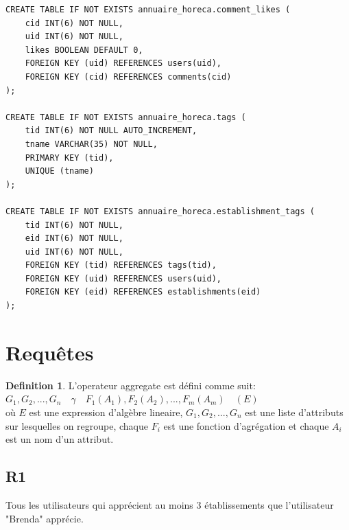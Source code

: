\documentclass[11pt,a4paper]{report}
\begin{document}
\begin{verbatim}
CREATE TABLE IF NOT EXISTS annuaire_horeca.comment_likes (
    cid INT(6) NOT NULL,
    uid INT(6) NOT NULL,
    likes BOOLEAN DEFAULT 0,
    FOREIGN KEY (uid) REFERENCES users(uid),
    FOREIGN KEY (cid) REFERENCES comments(cid)
);

CREATE TABLE IF NOT EXISTS annuaire_horeca.tags (
    tid INT(6) NOT NULL AUTO_INCREMENT,
    tname VARCHAR(35) NOT NULL,
    PRIMARY KEY (tid),
    UNIQUE (tname)
);

CREATE TABLE IF NOT EXISTS annuaire_horeca.establishment_tags (
    tid INT(6) NOT NULL,
    eid INT(6) NOT NULL,
    uid INT(6) NOT NULL,
    FOREIGN KEY (tid) REFERENCES tags(tid),
    FOREIGN KEY (uid) REFERENCES users(uid),
    FOREIGN KEY (eid) REFERENCES establishments(eid)
);
\end{verbatim}

\section*{Requêtes}
\theoremstyle{plain}
\newtheorem{thm}{Theorem}
\theoremstyle{definition}
\newtheorem{defn}[thm]{Definition}

\begin{defn} L'operateur aggregate est défini comme suit: \\
\begin{math}G_1, G_2, ..., G_n \quad \gamma \quad F_1(A_1), F_2(A_2), ..., F_m(A_m) \quad (E) \end{math} \\
où \begin{math} E \end{math} est une expression d'algèbre lineaire,  \begin{math}G_1, G_2, ..., G_n \end{math} est une liste d'attributs sur lesquelles on regroupe, chaque \begin{math} F_i \end{math} est une fonction d'agrégation et chaque \begin{math} A_i \end{math} est un nom d'un attribut. \end{defn}
\subsection*{R1}

\noindent Tous les utilisateurs qui apprécient au moins 3 établissements que l'utilisateur "Brenda" apprécie.
\end{document}
